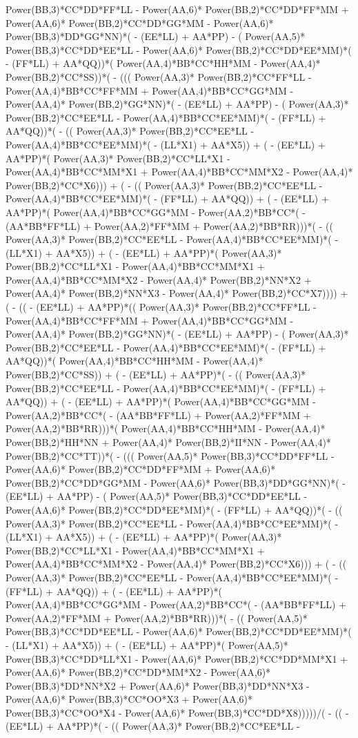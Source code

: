 \documentclass[10pt]{article} %
\begin{document}
{Power(BB,3)*CC*DD*FF*LL -  Power(AA,6)* Power(BB,2)*CC*DD*FF*MM +  Power(AA,6)* Power(BB,2)*CC*DD*GG*MM -  Power(AA,6)* Power(BB,3)*DD*GG*NN)*( - (EE*LL) + AA*PP) - ( Power(AA,5)* Power(BB,3)*CC*DD*EE*LL -  Power(AA,6)* Power(BB,2)*CC*DD*EE*MM)*( - (FF*LL) + AA*QQ))*( Power(AA,4)*BB*CC*HH*MM -  Power(AA,4)* Power(BB,2)*CC*SS))*( - ((( Power(AA,3)* Power(BB,2)*CC*FF*LL -  Power(AA,4)*BB*CC*FF*MM +  Power(AA,4)*BB*CC*GG*MM -  Power(AA,4)* Power(BB,2)*GG*NN)*( - (EE*LL) + AA*PP) - ( Power(AA,3)* Power(BB,2)*CC*EE*LL -  Power(AA,4)*BB*CC*EE*MM)*( - (FF*LL) + AA*QQ))*( - (( Power(AA,3)* Power(BB,2)*CC*EE*LL -  Power(AA,4)*BB*CC*EE*MM)*( - (LL*X1) + AA*X5)) + ( - (EE*LL) + AA*PP)*( Power(AA,3)* Power(BB,2)*CC*LL*X1 -  Power(AA,4)*BB*CC*MM*X1 +  Power(AA,4)*BB*CC*MM*X2 -  Power(AA,4)* Power(BB,2)*CC*X6))) + ( - (( Power(AA,3)* Power(BB,2)*CC*EE*LL -  Power(AA,4)*BB*CC*EE*MM)*( - (FF*LL) + AA*QQ)) + ( - (EE*LL) + AA*PP)*( Power(AA,4)*BB*CC*GG*MM -  Power(AA,2)*BB*CC*( - (AA*BB*FF*LL) +  Power(AA,2)*FF*MM +  Power(AA,2)*BB*RR)))*( - (( Power(AA,3)* Power(BB,2)*CC*EE*LL -  Power(AA,4)*BB*CC*EE*MM)*( - (LL*X1) + AA*X5)) + ( - (EE*LL) + AA*PP)*( Power(AA,3)* Power(BB,2)*CC*LL*X1 -  Power(AA,4)*BB*CC*MM*X1 +  Power(AA,4)*BB*CC*MM*X2 -  Power(AA,4)* Power(BB,2)*NN*X2 +  Power(AA,4)* Power(BB,2)*NN*X3 -  Power(AA,4)* Power(BB,2)*CC*X7)))) + ( - (( - (EE*LL) + AA*PP)*(( Power(AA,3)* Power(BB,2)*CC*FF*LL -  Power(AA,4)*BB*CC*FF*MM +  Power(AA,4)*BB*CC*GG*MM -  Power(AA,4)* Power(BB,2)*GG*NN)*( - (EE*LL) + AA*PP) - ( Power(AA,3)* Power(BB,2)*CC*EE*LL -  Power(AA,4)*BB*CC*EE*MM)*( - (FF*LL) + AA*QQ))*( Power(AA,4)*BB*CC*HH*MM -  Power(AA,4)* Power(BB,2)*CC*SS)) + ( - (EE*LL) + AA*PP)*( - (( Power(AA,3)* Power(BB,2)*CC*EE*LL -  Power(AA,4)*BB*CC*EE*MM)*( - (FF*LL) + AA*QQ)) + ( - (EE*LL) + AA*PP)*( Power(AA,4)*BB*CC*GG*MM -  Power(AA,2)*BB*CC*( - (AA*BB*FF*LL) +  Power(AA,2)*FF*MM +  Power(AA,2)*BB*RR)))*( Power(AA,4)*BB*CC*HH*MM -  Power(AA,4)* Power(BB,2)*HH*NN +  Power(AA,4)* Power(BB,2)*II*NN -  Power(AA,4)* Power(BB,2)*CC*TT))*( - ((( Power(AA,5)* Power(BB,3)*CC*DD*FF*LL -  Power(AA,6)* Power(BB,2)*CC*DD*FF*MM +  Power(AA,6)* Power(BB,2)*CC*DD*GG*MM -  Power(AA,6)* Power(BB,3)*DD*GG*NN)*( - (EE*LL) + AA*PP) - ( Power(AA,5)* Power(BB,3)*CC*DD*EE*LL -  Power(AA,6)* Power(BB,2)*CC*DD*EE*MM)*( - (FF*LL) + AA*QQ))*( - (( Power(AA,3)* Power(BB,2)*CC*EE*LL -  Power(AA,4)*BB*CC*EE*MM)*( - (LL*X1) + AA*X5)) + ( - (EE*LL) + AA*PP)*( Power(AA,3)* Power(BB,2)*CC*LL*X1 -  Power(AA,4)*BB*CC*MM*X1 +  Power(AA,4)*BB*CC*MM*X2 -  Power(AA,4)* Power(BB,2)*CC*X6))) + ( - (( Power(AA,3)* Power(BB,2)*CC*EE*LL -  Power(AA,4)*BB*CC*EE*MM)*( - (FF*LL) + AA*QQ)) + ( - (EE*LL) + AA*PP)*( Power(AA,4)*BB*CC*GG*MM -  Power(AA,2)*BB*CC*( - (AA*BB*FF*LL) +  Power(AA,2)*FF*MM +  Power(AA,2)*BB*RR)))*( - (( Power(AA,5)* Power(BB,3)*CC*DD*EE*LL -  Power(AA,6)* Power(BB,2)*CC*DD*EE*MM)*( - (LL*X1) + AA*X5)) + ( - (EE*LL) + AA*PP)*( Power(AA,5)* Power(BB,3)*CC*DD*LL*X1 -  Power(AA,6)* Power(BB,2)*CC*DD*MM*X1 +  Power(AA,6)* Power(BB,2)*CC*DD*MM*X2 -  Power(AA,6)* Power(BB,3)*DD*NN*X2 +  Power(AA,6)* Power(BB,3)*DD*NN*X3 -  Power(AA,6)* Power(BB,3)*CC*OO*X3 +  Power(AA,6)* Power(BB,3)*CC*OO*X4 -  Power(AA,6)* Power(BB,3)*CC*DD*X8)))))/( - (( - (EE*LL) + AA*PP)*( - (( Power(AA,3)* Power(BB,2)*CC*EE*LL -  }
\end{document}
